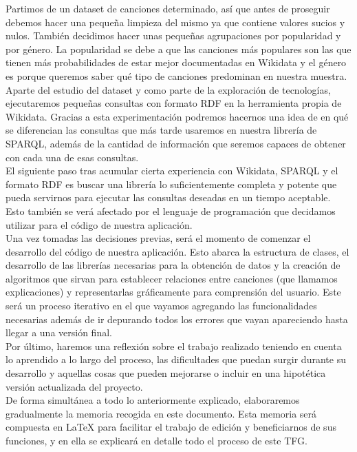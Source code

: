 Partimos de un dataset de canciones determinado, así que antes de proseguir debemos hacer una pequeña limpieza del mismo ya que contiene valores sucios y nulos. También decidimos hacer unas pequeñas agrupaciones por popularidad y por género. La popularidad se debe a que las canciones más populares son las que tienen más probabilidades de estar mejor documentadas en Wikidata y el género es porque queremos saber qué tipo de canciones predominan en nuestra muestra.\\

Aparte del estudio del dataset y como parte de la exploración de tecnologías, ejecutaremos pequeñas consultas con formato RDF en la herramienta propia de Wikidata. Gracias a esta experimentación podremos hacernos una idea de en qué se diferencian las consultas que más tarde usaremos en nuestra librería de SPARQL, además de la cantidad de información que seremos capaces de obtener con cada una de esas consultas.\\

El siguiente paso tras acumular cierta experiencia con Wikidata, SPARQL y el formato RDF es buscar una librería lo suficientemente completa y potente que pueda servirnos para ejecutar las consultas deseadas en un tiempo aceptable. Esto también se verá afectado por el lenguaje de programación que decidamos utilizar para el código de nuestra aplicación.\\

Una vez tomadas las decisiones previas, será el momento de comenzar el desarrollo del código de nuestra aplicación. Esto abarca la estructura de clases, el desarrollo de las librerías necesarias para la obtención de datos y la creación de algoritmos que sirvan para establecer relaciones entre canciones (que llamamos explicaciones) y representarlas gráficamente para comprensión del usuario. Este será un proceso iterativo en el que vayamos agregando las funcionalidades necesarias además de ir depurando todos los errores que vayan apareciendo hasta llegar a una versión final.\\

Por último, haremos una reflexión sobre el trabajo realizado teniendo en cuenta lo aprendido a lo largo del proceso, las dificultades que puedan surgir durante su desarrollo y aquellas cosas que pueden mejorarse o incluir en una hipotética versión actualizada del proyecto.\\

De forma simultánea a todo lo anteriormente explicado, elaboraremos gradualmente la memoria recogida en este documento. Esta memoria será compuesta en LaTeX para facilitar el trabajo de edición y beneficiarnos de sus funciones, y en ella se explicará en detalle todo el proceso de este TFG.\\

